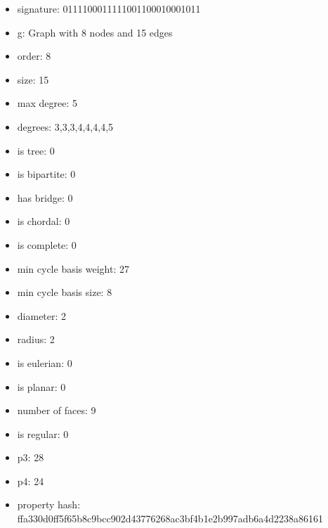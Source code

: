 \begin{itemize}
\item signature: 0111100011111001100010001011
\item g: Graph with 8 nodes and 15 edges
\item order: 8
\item size: 15
\item max degree: 5
\item degrees: 3,3,3,4,4,4,4,5
\item is tree: 0
\item is bipartite: 0
\item has bridge: 0
\item is chordal: 0
\item is complete: 0
\item min cycle basis weight: 27
\item min cycle basis size: 8
\item diameter: 2
\item radius: 2
\item is eulerian: 0
\item is planar: 0
\item number of faces: 9
\item is regular: 0
\item p3: 28
\item p4: 24
\item property hash: ffa330d0ff5f65b8c9bcc902d43776268ac3bf4b1e2b997adb6a4d2238a86161
\end{itemize}
\newpage
\begin{figure}
\end{figure}
